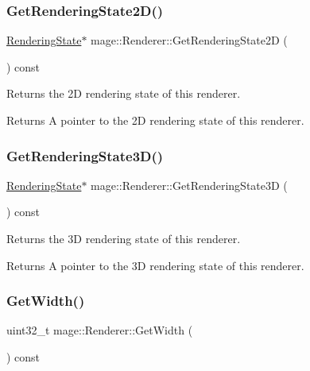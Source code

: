 \subsubsection{\texorpdfstring{Get\+Rendering\+State2\+D()}{GetRenderingState2D()}}
{\footnotesize\ttfamily \hyperlink{structmage_1_1_rendering_state}{Rendering\+State}$\ast$ mage\+::\+Renderer\+::\+Get\+Rendering\+State2D (\begin{DoxyParamCaption}{ }\end{DoxyParamCaption}) const\hspace{0.3cm}{\ttfamily [noexcept]}}

Returns the 2D rendering state of this renderer.

\begin{DoxyReturn}{Returns}
A pointer to the 2D rendering state of this renderer. 
\end{DoxyReturn}
\hypertarget{classmage_1_1_renderer_afde0b947dfcfea3515f6ddbfc25b8253}{}\label{classmage_1_1_renderer_afde0b947dfcfea3515f6ddbfc25b8253} 
\subsubsection{\texorpdfstring{Get\+Rendering\+State3\+D()}{GetRenderingState3D()}}
{\footnotesize\ttfamily \hyperlink{structmage_1_1_rendering_state}{Rendering\+State}$\ast$ mage\+::\+Renderer\+::\+Get\+Rendering\+State3D (\begin{DoxyParamCaption}{ }\end{DoxyParamCaption}) const\hspace{0.3cm}{\ttfamily [noexcept]}}

Returns the 3D rendering state of this renderer.

\begin{DoxyReturn}{Returns}
A pointer to the 3D rendering state of this renderer. 
\end{DoxyReturn}
\hypertarget{classmage_1_1_renderer_a140938e7d5f576163d39ce249ebda99f}{}\label{classmage_1_1_renderer_a140938e7d5f576163d39ce249ebda99f} 
\subsubsection{\texorpdfstring{Get\+Width()}{GetWidth()}}
{\footnotesize\ttfamily uint32\+\_\+t mage\+::\+Renderer\+::\+Get\+Width (\begin{DoxyParamCaption}{ }\end{DoxyParamCaption}) const\hspace{0.3cm}{\ttfamily [noexcept]}}

